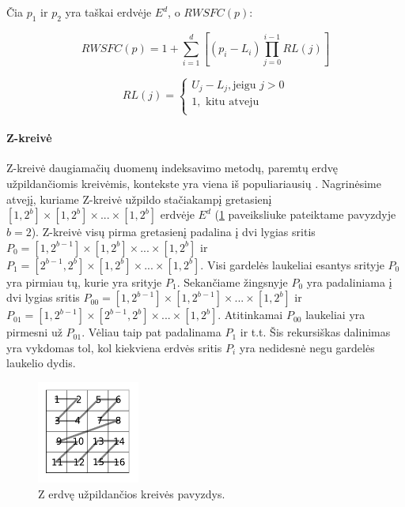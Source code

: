 Čia $p_1$ ir $p_2$ yra taškai erdvėje $E^d$, o $RWSFC(p)$:

\begin{equation}
	RWSFC(p) = 1 + \sum_{i=1}^{d} [(p_i - L_i) \prod_{j=0}^{i - 1}RL(j)]
\label{eq:RowWiseSFCValue}
\end{equation}

\begin{equation}
	RL(j) =
\begin{cases}
	U_j - L_j, \text{jeigu } j > 0\\
	1, \text{ kitu atveju}\\
\end{cases}
\end{equation}



\paragraph{Z-kreivė}

Z-kreivė daugiamačių duomenų indeksavimo metodų, paremtų erdvę užpildančiomis kreivėmis, kontekste yra viena iš populiariausių \cite{ramsak2000integrating}.
Nagrinėsime atvejį, kuriame Z-kreivė užpildo stačiakampį gretasienį $[1, 2^b] \times [1, 2^b] \times ... \times [1, 2^b]$ erdvėje $E^d$ (\ref{img:ZCurveSpaceFillingCurve} paveiksliuke pateiktame pavyzdyje $b=2$).
Z-kreivė visų pirma gretasienį padalina į dvi lygias sritis $P_0 = [1, 2^{b-1}] \times [1, 2^b] \times ... \times [1, 2^b]$ ir $P_1 = [2^{b-1}, 2^b] \times [1, 2^b] \times ... \times [1, 2^b]$.
Visi gardelės laukeliai esantys srityje $P_0$ yra pirmiau tų, kurie yra srityje $P_1$.
Sekančiame žingsnyje $P_0$ yra padaliniama į dvi lygias sritis $P_{00} = [1, 2^{b-1}] \times [1, 2^{b-1}] \times ... \times [1, 2^b]$ ir $P_{01} = [1, 2^{b-1}] \times [2^{b-1}, 2^b] \times ... \times [1, 2^b]$.
Atitinkamai $P_{00}$ laukeliai yra pirmesni už $P_{01}$.
Vėliau taip pat padalinama $P_{1}$ ir t.t.
Šis rekursiškas dalinimas yra vykdomas tol, kol kiekviena erdvės sritis $P_i$ yra nedidesnė negu gardelės laukelio dydis.

\begin{figure}[H]
\begin{center}
\includegraphics[width=0.3\textwidth]{img/ZCurveSpaceFillingCurve.png}
\caption{Z erdvę užpildančios kreivės pavyzdys.}
\label{img:ZCurveSpaceFillingCurve}
\end{center}
\end{figure}

